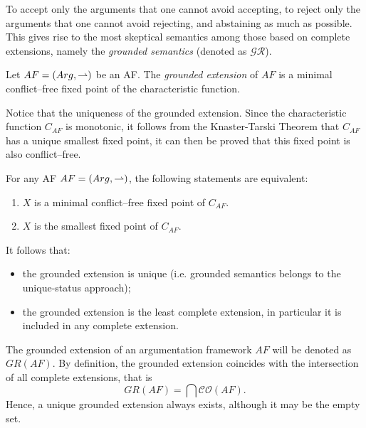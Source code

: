 
To accept only the arguments that one cannot avoid accepting, 
to reject only the arguments that one cannot avoid rejecting, 
and abstaining as much as possible.
% 
This gives rise to the {\color{teal} most skeptical semantics} among those based on complete extensions, 
namely the 
\textit{grounded semantics} (denoted as {\color{purple} $\mathcal{GR}$}).




\begin{df}
    Let $AF=(Arg,\rightharpoonup)$ be an AF.
    The \textit{grounded extension} of $AF$ is a minimal conflict--free fixed point of the characteristic function.
\end{df}


Notice that the {\color{teal} uniqueness} of the grounded extension. 
Since the characteristic function $C_{AF}$ is monotonic, 
it follows from the Knaster-Tarski Theorem that $C_{AF}$ has a unique smallest fixed point, 
it can then be proved that this fixed point is also conflict--free.



\begin{prop}
    For any AF $AF=(Arg,\rightharpoonup)$, 
    the following statements are equivalent:
    \begin{enumerate}[itemsep=5pt,parsep=5pt,leftmargin=3em,topsep=5pt,label=(\arabic*)] 
        \item $X$ is a minimal conflict--free fixed point of $C_{AF}$.
        
        \item $X$ is the smallest fixed point of $C_{AF}$.
    \end{enumerate} 
\end{prop}



It follows that:
\begin{itemize}[itemsep=5pt,parsep=5pt,leftmargin=3em,topsep=5pt]
    \item the grounded extension is unique 
    (i.e. grounded semantics belongs to the unique-status approach);


    \item the grounded extension is the least complete extension, 
    in particular it is included in any complete extension.
\end{itemize}




The grounded extension of an argumentation framework $AF$ will be denoted as {\color{purple} $GR(AF)$}.
% 
By definition,
the grounded extension coincides with the intersection of all complete extensions, 
that is 
\[
    GR(AF) = \bigcap \mathcal{CO} (AF).
\]
Hence, 
a unique grounded extension always exists, 
although it may be the empty set. 
% 



